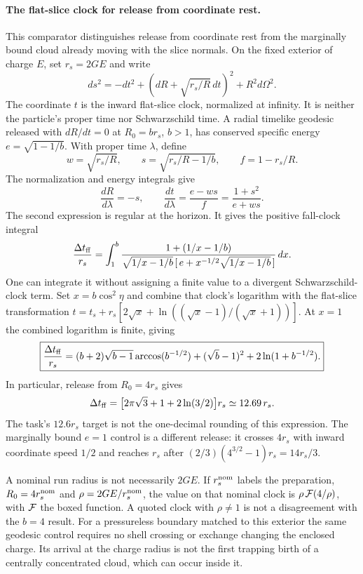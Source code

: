\documentclass[11pt]{article}
\begin{document}
\paragraph{The flat-slice clock for release from coordinate rest.}
This comparator distinguishes release from coordinate rest from the
marginally bound cloud already moving with the slice normals. On the
fixed exterior of charge $E$, set $r_s=2GE$ and write
\[
 ds^2=-dt^2+(dR+\sqrt{r_s/R}\,dt)^2+R^2d\Omega^2.
\]
The coordinate $t$ is the inward flat-slice clock, normalized at infinity.
It is neither the particle's proper time nor Schwarzschild time.
A radial timelike geodesic released with $dR/dt=0$ at
$R_0=b r_s$, $b>1$, has conserved specific energy
$e=\sqrt{1-1/b}$. With proper time $\lambda$, define
\[
 w=\sqrt{r_s/R},\qquad s=\sqrt{r_s/R-1/b},\qquad f=1-r_s/R .
\]
The normalization and energy integrals give
\[
 \frac{dR}{d\lambda}=-s,\qquad
 \frac{dt}{d\lambda}
 =\frac{e-ws}{f}
 =\frac{1+s^2}{e+ws}.
\]
The second expression is regular at the horizon. It gives the positive
fall-clock integral
\[
 \frac{\Delta t_{\rm ff}}{r_s}
 =\int_1^b
   \frac{1+(1/x-1/b)}
   {\sqrt{1/x-1/b}\,[\,e+x^{-1/2}\sqrt{1/x-1/b}\,]}\,dx .
\]
One can integrate it without assigning a finite value to a divergent
Schwarzschild-clock term. Set $x=b\cos^2\eta$ and combine that clock's
logarithm with the flat-slice transformation
$t=t_s+r_s[2\sqrt{x}+\ln((\sqrt{x}-1)/(\sqrt{x}+1))]$.
At $x=1$ the combined logarithm is finite, giving
\[
 \boxed{\frac{\Delta t_{\rm ff}}{r_s}
 =(b+2)\sqrt{b-1}\arccos(b^{-1/2})
   +(\sqrt b-1)^2+2\ln(1+b^{-1/2}) .}
\]
In particular, release from $R_0=4r_s$ gives
\[
 \Delta t_{\rm ff}
 =\bigl[2\pi\sqrt3+1+2\ln(3/2)\bigr]r_s
 \simeq12.69\,r_s .
\]
The task's $12.6r_s$ target is not the one-decimal rounding of this
expression. The marginally bound $e=1$ control is a different release:
it crosses $4r_s$ with inward coordinate speed $1/2$ and reaches $r_s$
after $(2/3)(4^{3/2}-1)r_s=14r_s/3$.

A nominal run radius is not necessarily $2GE$. If
$r_s^{\rm nom}$ labels the preparation, $R_0=4r_s^{\rm nom}$ and
$\rho=2GE/r_s^{\rm nom}$, the value on that nominal clock is
$\rho\,{\cal F}(4/\rho)$, with ${\cal F}$ the boxed function. A quoted
clock with $\rho\ne1$ is not a disagreement with the $b=4$ result.
For a pressureless boundary matched to this exterior the same geodesic
control requires no shell crossing or exchange changing the enclosed
charge. Its arrival at the charge radius is not the first trapping
birth of a centrally concentrated cloud, which can occur inside it.
\end{document}

